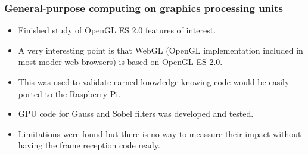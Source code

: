 \subsubsection{General-purpose computing on graphics processing units}
\begin{itemize}
	\item Finished study of OpenGL ES 2.0 features of interest.
	\item A very interesting point is that WebGL (OpenGL implementation included in most moder web browsers) is based on OpenGL ES 2.0.
	\item This was used to validate earned knowledge knowing code would be easily ported to the Raspberry Pi.
	\item GPU code for Gauss and Sobel filters was developed and tested.
	\item Limitations were found but there is no way to meassure their impact without having the frame reception code ready.
\end{itemize}

